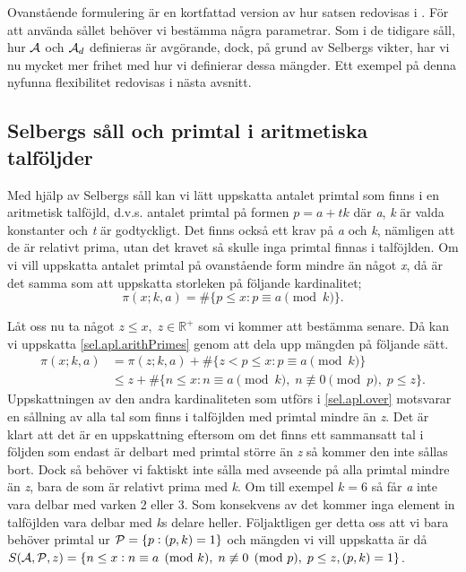 Ovanstående formulering är en kortfattad version av hur satsen redovisas i \cite{cojocarumurty}. För att använda sållet behöver vi bestämma några parametrar. 
Som i de tidigare såll, hur \(\A\) och \(\A_d\) definieras är avgörande, dock, på grund av Selbergs vikter, har vi nu mycket mer frihet med hur vi definierar dessa mängder. 
Ett exempel på denna nyfunna flexibilitet redovisas i nästa avsnitt.

\subsection{Selbergs såll och primtal i aritmetiska talföljder}

Med hjälp av Selbergs såll kan vi lätt uppskatta antalet primtal som finns i en aritmetisk talföjld, d.v.s. antalet primtal på formen \(p = a + tk\) där \textit{a}, \textit{k} är valda konstanter och \textit{t} är godtyckligt. 
Det finns också ett krav på \textit{a} och \textit{k}, nämligen att de är relativt prima, utan det kravet så skulle inga primtal finnas i talföjlden. 
Om vi vill uppskatta antalet primtal på ovanstående form mindre än något \textit{x}, då är det samma som att uppskatta storleken på följande kardinalitet;
\begin{equation}
    \pi(x;k,a) = \#\{p\leq x: p \equiv a \pmod{k}\}.\label{sel.apl.arithPrimes}
\end{equation}

Låt oss nu ta något \(z\leq x,\; z \in \mathbb{R}^+\) som vi kommer att bestämma senare. Då kan vi uppskatta \eqref{sel.apl.arithPrimes} genom att dela upp mängden på följande sätt.
\begin{align}
    \pi(x;k,a) &= \pi(z;k,a) + \#\{z<p\leq x: p \equiv a \pmod{k}\} \nonumber\\
    &\leq z + \#\{n\leq x: n \equiv a \pmod k,\; n \not\equiv 0 \pmod p,\; p\leq z\}.\label{sel.apl.over}
\end{align}
Uppskattningen av den andra kardinaliteten som utförs i \eqref{sel.apl.over} motsvarar en sållning av alla tal som finns i talföjlden med primtal mindre än \textit{z}. 
Det är klart att det är en uppskattning eftersom om det finns ett sammansatt tal i följden som endast är delbart med primtal större än \textit{z} så kommer den inte sållas bort. 
Dock så behöver vi faktiskt inte sålla med avseende på alla primtal mindre än \textit{z}, bara de som är relativt prima med \textit{k}. 
Om till exempel \(k = 6\) så får \textit{a} inte vara delbar med varken 2 eller 3.
Som konsekvens av det kommer inga element in talföjlden vara delbar med \textit{k}s delare heller.
Följaktligen ger detta oss att vi bara behöver primtal ur \(\P = \{p: (p, k) = 1\}\) och mängden vi vill uppskatta är då \(\S{A}{P}{z} = \{n\leq x: n \equiv a \pmod k,\; n \not\equiv 0 \pmod p,\; p\leq z, (p,k) = 1\}\).

